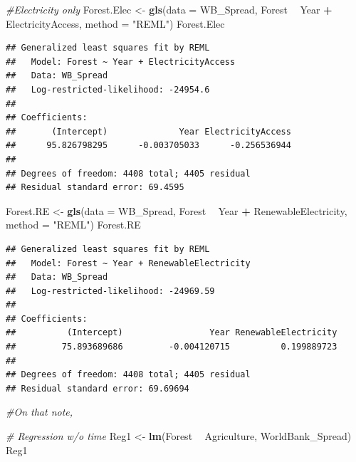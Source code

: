\documentclass[12pt,]{article}
\newenvironment{Shaded}{\begin{snugshade}}{\end{snugshade}}
\newcommand{\KeywordTok}[1]{\textcolor[rgb]{0.13,0.29,0.53}{\textbf{#1}}}
\newcommand{\DataTypeTok}[1]{\textcolor[rgb]{0.13,0.29,0.53}{#1}}
\newcommand{\StringTok}[1]{\textcolor[rgb]{0.31,0.60,0.02}{#1}}
\newcommand{\CommentTok}[1]{\textcolor[rgb]{0.56,0.35,0.01}{\textit{#1}}}
\newcommand{\OperatorTok}[1]{\textcolor[rgb]{0.81,0.36,0.00}{\textbf{#1}}}
\newcommand{\NormalTok}[1]{#1}
\begin{document}
\begin{Shaded}
\begin{Highlighting}[]
\CommentTok{#Electricity only }
\NormalTok{Forest.Elec <-}\StringTok{ }\KeywordTok{gls}\NormalTok{(}\DataTypeTok{data =}\NormalTok{ WB_Spread, }
\NormalTok{                    Forest }\OperatorTok{~}\StringTok{ }\NormalTok{Year }\OperatorTok{+}\StringTok{ }\NormalTok{ElectricityAccess,}
                    \DataTypeTok{method =} \StringTok{"REML"}\NormalTok{)}
\NormalTok{Forest.Elec}
\end{Highlighting}
\end{Shaded}

\begin{verbatim}
## Generalized least squares fit by REML
##   Model: Forest ~ Year + ElectricityAccess 
##   Data: WB_Spread 
##   Log-restricted-likelihood: -24954.6
## 
## Coefficients:
##       (Intercept)              Year ElectricityAccess 
##      95.826798295      -0.003705033      -0.256536944 
## 
## Degrees of freedom: 4408 total; 4405 residual
## Residual standard error: 69.4595
\end{verbatim}

\begin{Shaded}
\begin{Highlighting}[]
\NormalTok{Forest.RE <-}\StringTok{ }\KeywordTok{gls}\NormalTok{(}\DataTypeTok{data =}\NormalTok{ WB_Spread, }
\NormalTok{                    Forest }\OperatorTok{~}\StringTok{ }\NormalTok{Year }\OperatorTok{+}\StringTok{ }\NormalTok{RenewableElectricity,}
                    \DataTypeTok{method =} \StringTok{"REML"}\NormalTok{)}
\NormalTok{Forest.RE}
\end{Highlighting}
\end{Shaded}

\begin{verbatim}
## Generalized least squares fit by REML
##   Model: Forest ~ Year + RenewableElectricity 
##   Data: WB_Spread 
##   Log-restricted-likelihood: -24969.59
## 
## Coefficients:
##          (Intercept)                 Year RenewableElectricity 
##         75.893689686         -0.004120715          0.199889723 
## 
## Degrees of freedom: 4408 total; 4405 residual
## Residual standard error: 69.69694
\end{verbatim}

\begin{Shaded}
\begin{Highlighting}[]
\CommentTok{#On that note, }

\CommentTok{# Regression w/o time }
\NormalTok{Reg1 <-}\StringTok{ }\KeywordTok{lm}\NormalTok{(Forest }\OperatorTok{~}\StringTok{ }\NormalTok{Agriculture, WorldBank_Spread)}
\NormalTok{Reg1}
\end{Highlighting}
\end{Shaded}
\end{document}
